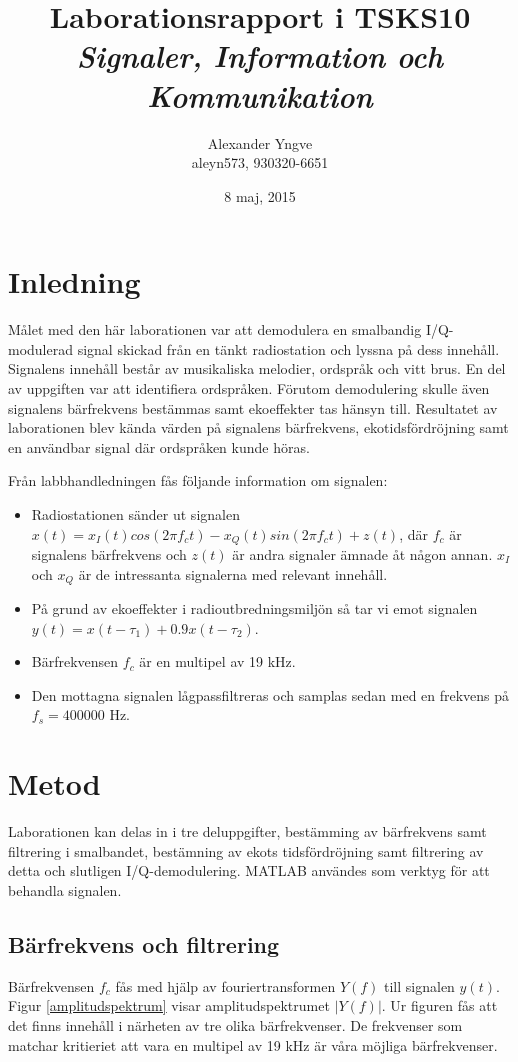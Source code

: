 \documentclass[10pt]{article}
\title{Laborationsrapport i TSKS10 \emph{Signaler, Information och Kommunikation}}
\author{Alexander Yngve\\aleyn573, 930320-6651}
\date{8 maj, 2015}
\begin{document}
\maketitle

\clearpage

\begin{multicols}{2}
\section{Inledning} \label{inledning}

Målet med den här laborationen var att demodulera en smalbandig I/Q-modulerad signal skickad från en tänkt radiostation och lyssna på dess innehåll. Signalens innehåll består av musikaliska melodier, ordspråk och vitt brus. En del av uppgiften var att identifiera ordspråken. Förutom demodulering skulle även signalens bärfrekvens bestämmas samt ekoeffekter tas hänsyn till. Resultatet av laborationen blev kända värden på signalens bärfrekvens, ekotidsfördröjning samt en användbar signal där ordspråken kunde höras.

Från labbhandledningen fås följande information om signalen:

\begin{itemize}
\item Radiostationen sänder ut signalen $x(t) = x_I(t)cos(2\pi f_ct) - x_Q(t)sin(2\pi f_ct) + z(t)$, där $f_c$ är signalens bärfrekvens och $z(t)$ är andra signaler ämnade åt någon annan. $x_I$ och $x_Q$ är de intressanta signalerna med relevant innehåll.
\item På grund av ekoeffekter i radioutbredningsmiljön så tar vi emot signalen $y(t) = x(t - \tau_1) + 0.9x(t - \tau_2)$. 
\item Bärfrekvensen $f_c$ är en multipel av 19 kHz.
\item Den mottagna signalen lågpassfiltreras och samplas sedan med en frekvens på $f_s = 400000$ Hz.
\end{itemize}

\section{Metod}

Laborationen kan delas in i tre deluppgifter, bestämming av bärfrekvens samt filtrering i smalbandet, bestämning av ekots tidsfördröjning samt filtrering av detta och slutligen I/Q-demodulering. MATLAB användes som verktyg för att behandla signalen.

\subsection{Bärfrekvens och filtrering} \label{filtrering}
Bärfrekvensen $f_c$ fås med hjälp av fouriertransformen $Y(f)$ till signalen $y(t)$. Figur \ref{amplitudspektrum} visar amplitudspektrumet $|Y(f)|$. Ur figuren fås att det finns innehåll i närheten av tre olika bärfrekvenser. De frekvenser som matchar kritieriet att vara en multipel av 19 kHz är våra möjliga bärfrekvenser.


\end{multicols}
\end{document}
